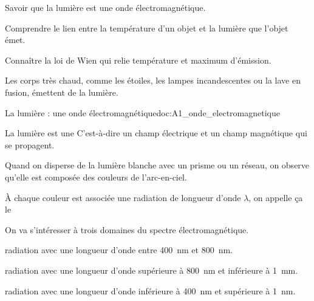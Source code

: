 \tetePremStssLumi



\begin{objectifs}
  \item Savoir que la lumière est une onde électromagnétique.
  \item Comprendre le lien entre la température d'un objet et la lumière que l'objet émet.
  \item Connaître la loi de Wien qui relie température et maximum d'émission.
\end{objectifs}

\begin{contexte}
  Les corps très chaud, comme les étoiles, les lampes incandescentes ou la lave en fusion, émettent de la lumière.
  
\end{contexte}


\begin{doc}{La lumière : une onde électromagnétique}{doc:A1_onde_electromagnetique}
  \begin{importants}
    La lumière est une 
    C'est-à-dire un champ électrique et un champ magnétique qui se propagent.
  \end{importants}

  Quand on disperse de la lumière blanche avec un prisme ou un réseau, on observe qu'elle est composée des couleurs de l'arc-en-ciel.
  \begin{center}
  \end{center}
  \begin{center}
  \end{center}

  À chaque couleur est associée une radiation de longueur d'onde $\lambda$, on appelle ça le 

  \begin{importants}    
    On va s'intéresser à trois domaines du spectre électromagnétique.
    \begin{listePoints}
      \item {} radiation avec une longueur d'onde entre \qty{400}{\nm} et \qty{800}{\nm}.
      \item {} radiation avec une longueur d'onde supérieure à \qty{800}{\nm} et inférieure à \qty{1}{\mm}.
      \item {} radiation avec une longueur d'onde inférieure à \qty{400}{\nm} et supérieure à \qty{1}{\nm}.
    \end{listePoints}
  \end{importants}
\end{doc}

